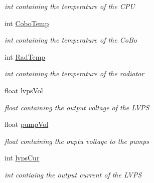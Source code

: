 \begin{DoxyCompactItemize}
\begin{DoxyCompactList}\small\item\em int containing the temperature of the C\+PU \end{DoxyCompactList}\item 
\mbox{\label{classIEvent_aa1976a0d83f49c0565c44f5f5b8e3e6f}} 
int \hyperlink{classIEvent_aa1976a0d83f49c0565c44f5f5b8e3e6f}{Cobo\+Temp}
\begin{DoxyCompactList}\small\item\em int containing the temperature of the Co\+Bo \end{DoxyCompactList}\item 
\mbox{\label{classIEvent_ad44520b1d00381acbd260ea5c11fd45c}} 
int \hyperlink{classIEvent_ad44520b1d00381acbd260ea5c11fd45c}{Rad\+Temp}
\begin{DoxyCompactList}\small\item\em int containing the temperature of the radiator \end{DoxyCompactList}\item 
\mbox{\label{classIEvent_ae1386ab88a27eecac13a67dd53e59f4c}} 
float \hyperlink{classIEvent_ae1386ab88a27eecac13a67dd53e59f4c}{lvps\+Vol}
\begin{DoxyCompactList}\small\item\em float containing the output voltage of the L\+V\+PS \end{DoxyCompactList}\item 
\mbox{\label{classIEvent_a0640be30a90c6510362249a871ba9939}} 
float \hyperlink{classIEvent_a0640be30a90c6510362249a871ba9939}{pump\+Vol}
\begin{DoxyCompactList}\small\item\em float containing the ouptu voltage to the pumps \end{DoxyCompactList}\item 
\mbox{\label{classIEvent_a56f761a083af7a8aef769de22fd1cb54}} 
int \hyperlink{classIEvent_a56f761a083af7a8aef769de22fd1cb54}{lvps\+Cur}
\begin{DoxyCompactList}\small\item\em int contiaing the output current of the L\+V\+PS \end{DoxyCompactList}\item 

\end{DoxyCompactItemize}
